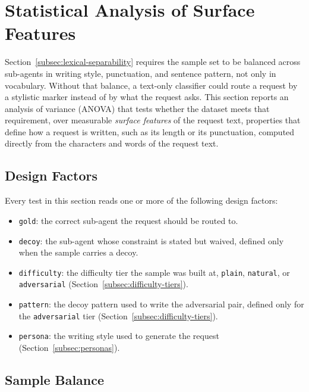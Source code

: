 \section{Statistical Analysis of Surface Features}
\label{sec:statistical-validation}

Section~\ref{subsec:lexical-separability} requires the sample set to be balanced across sub-agents in writing style, punctuation, and sentence pattern, not only in vocabulary. Without that balance, a text-only classifier could route a request by a stylistic marker instead of by what the request asks. This section reports an analysis of variance (ANOVA) that tests whether the dataset meets that requirement, over measurable \emph{surface features} of the request text, properties that define how a request is written, such as its length or its punctuation, computed directly from the characters and words of the request text.

\subsection{Design Factors}
\label{subsec:design-factors}

Every test in this section reads one or more of the following design factors:

\begin{itemize}
    \item \texttt{gold}: the correct sub-agent the request should be routed to.
    \item \texttt{decoy}: the sub-agent whose constraint is stated but waived, defined only when the sample carries a decoy.
    \item \texttt{difficulty}: the difficulty tier the sample was built at, \texttt{plain}, \texttt{natural}, or \texttt{adversarial} (Section~\ref{subsec:difficulty-tiers}).
    \item \texttt{pattern}: the decoy pattern used to write the adversarial pair, defined only for the \texttt{adversarial} tier (Section~\ref{subsec:difficulty-tiers}).
    \item \texttt{persona}: the writing style used to generate the request (Section~\ref{subsec:personas}).
\end{itemize}

\subsection{Sample Balance}
\label{subsec:sample-balance}

